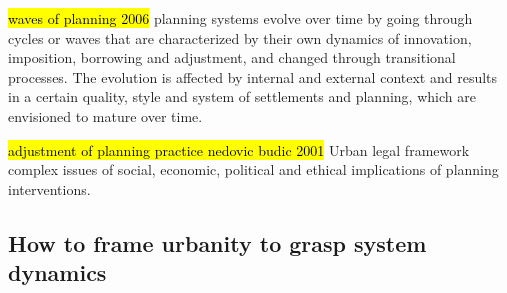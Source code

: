 \documentclass[11pt]{report}
\begin{document}
 	\hl{waves of planning 2006}
planning systems evolve over time by going through cycles or waves that are characterized  by  their  own  dynamics  of  innovation,  imposition,  borrowing  and  adjustment,  and changed through transitional processes. The evolution is affected by internal and external context and results in a certain quality, style and system of settlements and planning, which
are envisioned to mature over time.

\hl{adjustment of planning practice nedovic budic 2001}   
Urban legal framework complex issues of social, economic, political and ethical implications of planning interventions.

\subsection{How to frame urbanity to grasp system dynamics}
\end{document}
